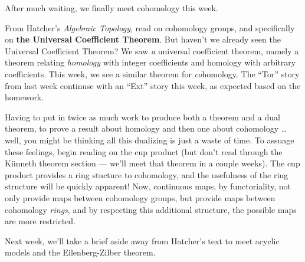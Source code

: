 \documentclass{homework}
\author{Jim Fowler}
\date{Week 5: Cohomology and coefficients}
\begin{document}
\maketitle

After much waiting, we finally meet cohomology this week.

From Hatcher's \textit{Algebraic Topology}, read  on
cohomology groups, and specifically on \textbf{the Universal
Coefficient Theorem}.  But haven't we already seen the Universal
Coefficient Theorem?  We saw \textit{a} universal coefficient theorem,
namely a theorem relating \textit{homology} with integer coefficients
and homology with arbitrary coefficients.  This week, we see a similar
theorem for \textit{co}homology.  The ``Tor'' story from last week
continuse with an ``Ext'' story this week, as expected based on the
homework.

Having to put in twice as much work to produce both a theorem and a
dual theorem, to prove a result about homology and then one about
cohomology \ldots well, you might be thinking all this dualizing is
just a waste of time.  To assuage these feelings, begin reading
 on the cup product (but don't read through the
K\"unneth theorem section --- we'll meet that theorem in a couple
weeks).  The cup product provides a ring stucture to cohomology, and
the usefulness of the ring structure will be quickly apparent!  Now,
continuous maps, by functoriality, not only provide maps between
cohomology groups, but provide maps between cohomology \textit{rings},
and by respecting this additional structure, the possible maps are
more restricted.

Next week, we'll take a brief aside away from Hatcher's text to meet
acyclic models and the Eilenberg-Zilber theorem.
\end{document}
